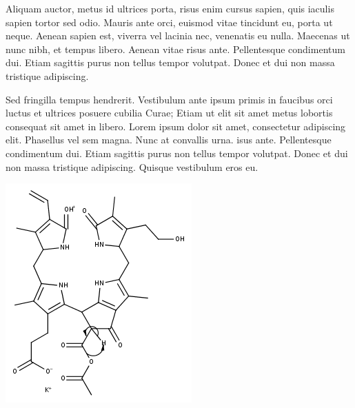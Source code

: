 \documentclass[landscape,a0paper,fontscale=0.285]{baposter} %
\begin{document}
\begin{poster}
{\begin{multicols}{2}
Aliquam auctor, metus id ultrices porta, risus enim cursus sapien, quis iaculis sapien tortor sed odio. Mauris ante orci, euismod vitae tincidunt eu, porta ut neque. Aenean sapien est, viverra vel lacinia nec, venenatis eu nulla. Maecenas ut nunc nibh, et tempus libero. Aenean vitae risus ante. Pellentesque condimentum dui. Etiam sagittis purus non tellus tempor volutpat. Donec et dui non massa tristique adipiscing.
\end{multicols}


\begin{multicols}{2}
\vspace{1em}
Sed fringilla tempus hendrerit. Vestibulum ante ipsum primis in faucibus orci luctus et ultrices posuere cubilia Curae; Etiam ut elit sit amet metus lobortis consequat sit amet in libero. Lorem ipsum dolor sit amet, consectetur adipiscing elit. Phasellus vel sem magna. Nunc at convallis urna. isus ante. Pellentesque condimentum dui. Etiam sagittis purus non tellus tempor volutpat. Donec et dui non massa tristique adipiscing. Quisque vestibulum eros eu.

\begin{center}
\includegraphics[width=0.8\linewidth, height=0.3\textheight]{VWA_Katabolit_699-639_MK_electronMovement}
\end{center}


\end{multicols}}
\end{poster}
\end{document}
